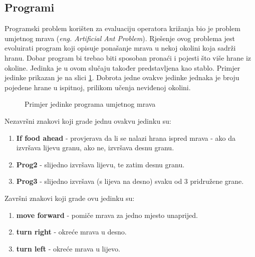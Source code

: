 \subsection{Programi}
Programski problem korišten za evaluaciju operatora križanja bio je problem umjetnog mrava (\textit{eng. Artificial Ant Problem}). Rješenje ovog problema jest evoluirati program koji opisuje ponašanje mrava u nekoj okolini koja sadrži hranu. Dobar program bi trebao biti sposoban pronaći i pojesti što više hrane iz okoline. Jedinka je u ovom slučaju također predstavljena kao stablo. Primjer jedinke prikazan je na slici \ref{ant}. Dobrota jedne ovakve jedinke jednaka je broju pojedene hrane u ispitnoj, prilikom učenja neviđenoj okolini.

\begin{figure}[H]
	\centering


	\caption{Primjer jedinke programa umjetnog mrava}
	\label{ant}
\end{figure}

Nezavršni znakovi koji grade jednu ovakvu jedinku su:

\begin{enumerate}

  \item \textbf{If food ahead} - provjerava da li se nalazi hrana ispred mrava - ako da izvršava lijevu granu, ako ne, izvršava desnu granu.
  \item \textbf{Prog2} - slijedno izvršava lijevu, te zatim desnu granu.
  \item \textbf{Prog3} - slijedno izvršava (s lijeva na desno) svaku od 3 pridružene grane.

\end{enumerate}

Završni znakovi koji grade ovu jedinku su:
\begin{enumerate}

  \item \textbf{move forward} - pomiče mrava za jedno mjesto unaprijed.
  \item \textbf{turn right} - okreće mrava u desno.
  \item \textbf{turn left} - okreće mrava u lijevo.

\end{enumerate}


